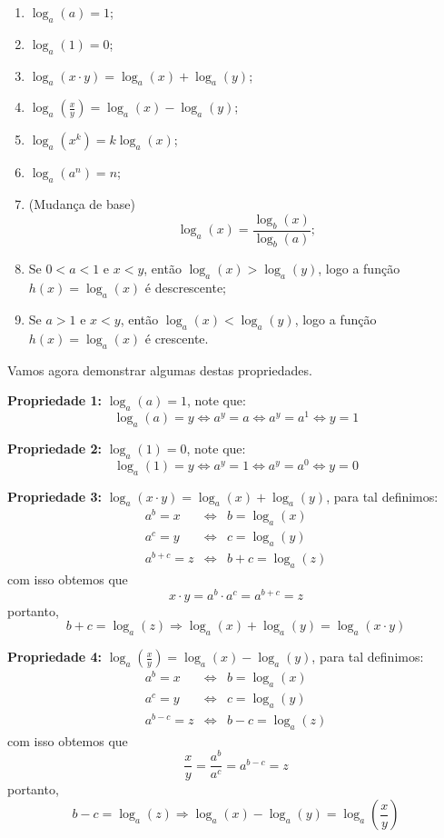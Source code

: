   \begin{enumerate}
  \item $\log_{a}(a)= 1$;
  \item $\log_{a}(1)= 0$;
   \item $\log_{a}(x \cdot y)=\log_{a}(x) + \log_{a}(y)$;
   \item $\log_{a} \left(\frac{x}{y}\right)=\log_{a}(x) - \log_{a}(y)$;
   \item $\log_{a}(x^{k})= k \log_{a}(x)$;
   \item $\log_{a}(a^n)= n$;
   \item (Mudança de base) \[\log_{a}(x)=\frac{\log_{b}(x)}{\log_{b}(a)};\]
   \item Se $0 < a < 1$ e $x < y$, então $\log_{a}(x) > \log_{a}(y)$, logo a função $h(x)= \log_{a}(x)$ é descrescente;
   \item Se $a> 1$ e $x < y$, então $\log_{a}(x) < \log_{a}(y)$, logo a função $h(x)= \log_{a}(x)$ é crescente.
  \end{enumerate}
  
  Vamos agora demonstrar algumas destas propriedades.
  
  \textbf{Propriedade 1:} $\log_{a}(a)= 1$, note que:
  \[\log_{a}(a)= y \Leftrightarrow a^y = a \Leftrightarrow a^y= a^1 \Leftrightarrow y=1\]
  \fim
  
  \textbf{Propriedade 2:} $\log_{a}(1)= 0$, note que:
  \[\log_{a}(1)= y \Leftrightarrow a^y= 1 \Leftrightarrow a^y= a^0 \Leftrightarrow y=0\]
  \fim
    
  \textbf{Propriedade 3:} $\log_{a}(x \cdot y)=\log_{a}(x) + \log_{a}(y)$, para tal definimos:
  \begin{eqnarray*}
   a^b= x & \Leftrightarrow & b= \log_{a}(x) \\
   a^c= y & \Leftrightarrow & c= \log_{a}(y) \\
   a^{b+c}= z & \Leftrightarrow & b+c= \log_{a}(z)
  \end{eqnarray*}
  com isso obtemos que 
  \[x \cdot y= a^b \cdot a^c= a^{b+c}= z\]
  portanto,
  \[b+c= \log_{a}(z) \Rightarrow \log_{a}(x) + \log_{a}(y)= \log_{a}(x \cdot y)\]
  \fim
  
  \textbf{Propriedade 4:} $\log_{a} \left(\frac{x}{y}\right)=\log_{a}(x) - \log_{a}(y)$, para tal definimos:
  \begin{eqnarray*}
   a^b= x & \Leftrightarrow & b= \log_{a}(x) \\
   a^c= y & \Leftrightarrow & c= \log_{a}(y) \\
   a^{b-c}= z & \Leftrightarrow & b-c= \log_{a}(z)
  \end{eqnarray*}
  com isso obtemos que 
  \[\dfrac{x}{y}= \dfrac{a^b}{a^c}= a^{b-c}= z\]
  portanto,
  \[b-c= \log_{a}(z) \Rightarrow \log_{a}(x) - \log_{a}(y)= \log_{a}\left(\frac{x}{y}\right)\]
  \fim
  
